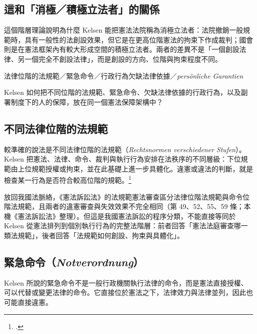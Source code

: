 \subsection{這和「消極／積極立法者」的關係}

這個階層理論說明為什麼 Kelsen 能把憲法法院稱為消極立法者：法院撤銷一般規範時，具有一般性的法創設效果，但它是在更高位階憲法的拘束下作成裁判；國會則是在憲法框架內有較大形成空間的積極立法者。兩者的差異不是「一個創設法律、另一個完全不創設法律」，而是創設的方向、位階與拘束程度不同。


\begin{qaprompt}
法律位階的法規範／緊急命令／行政行為欠缺法律依據／\emph{persönliche Garantien}
\end{qaprompt}

\begin{qaquestion}
Kelsen 如何把不同位階的法規範、緊急命令、欠缺法律依據的行政行為，以及副署制度下的人的保障，放在同一個憲法保障架構中？
\end{qaquestion}

\subsection{不同法律位階的法規範}

較準確的說法是不同法律位階的法規範（\emph{Rechtsnormen verschiedener Stufen}）。Kelsen 把憲法、法律、命令、裁判與執行行為安排在法秩序的不同層級：下位規範由上位規範授權或拘束，並在此基礎上進一步具體化。違憲或違法的判斷，就是檢查某一行為是否符合較高位階的規範。\footcites[23--25, 56]{kelsen2015}[31--33, 65]{kelsen1929}

放回我國法脈絡，《憲法訴訟法》的法規範憲法審查區分法律位階法規範與命令位階法規範，且兩者的違憲審查與失效效果不完全相同（第 49、52、55、59 條；本機《憲法訴訟法》整理）。但這是我國憲法訴訟的程序分類，不能直接等同於 Kelsen 從憲法排列到個別執行行為的完整法階層：前者回答「憲法法庭審查哪一類法規範」，後者回答「法規範如何創設、拘束與具體化」。

\subsection{\texorpdfstring{緊急命令（\emph{Notverordnung}）}{緊急命令（Notverordnung）}}

Kelsen 所說的緊急命令不是一般行政機關執行法律的命令，而是憲法直接授權、可以代替或變更法律的命令。它直接位於憲法之下，法律效力與法律並列，因此也可能直接違憲。

